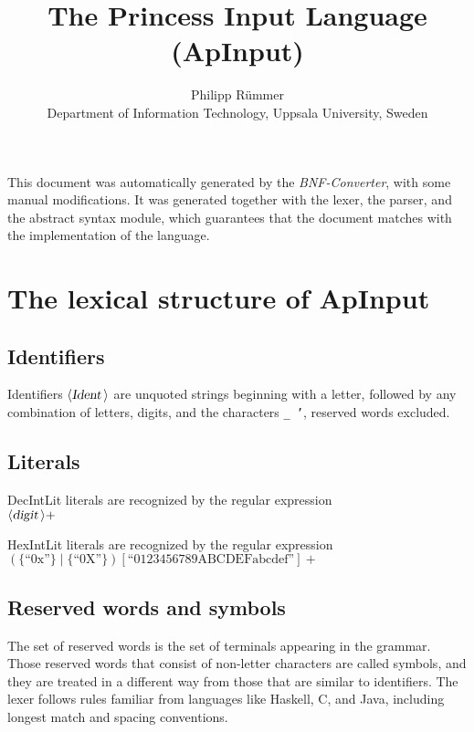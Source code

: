 \documentclass[a4paper,11pt]{article}
\author{Philipp R\"ummer\\
  Department
  of Information Technology, Uppsala University, Sweden}
\title{The Princess Input Language\\
  (ApInput)}
\begin{document}
\maketitle

\newcommand{\emptyP}{\mbox{$\epsilon$}}
\newcommand{\terminal}[1]{\mbox{{\texttt {#1}}}}
\newcommand{\nonterminal}[1]{\mbox{$\langle \mbox{{\sl #1 }} \! \rangle$}}
\newcommand{\arrow}{\mbox{::=}}
\newcommand{\delimit}{\mbox{$|$}}
\newcommand{\reserved}[1]{\mbox{{\texttt {#1}}}}
\newcommand{\literal}[1]{\mbox{{\texttt {#1}}}}
\newcommand{\symb}[1]{\mbox{{\texttt {#1}}}}

This document was automatically generated by the {\em BNF-Converter},
with some manual modifications. It was generated together with the
lexer, the parser, and the abstract syntax module, which guarantees
that the document matches with the implementation of the language.

\section*{The lexical structure of ApInput}
\subsection*{Identifiers}
Identifiers \nonterminal{Ident} are unquoted strings beginning with a letter,
followed by any combination of letters, digits, and the characters {\tt \_ '},
reserved words excluded.


\subsection*{Literals}



DecIntLit literals are recognized by the regular expression\\
\({\nonterminal{digit}}+\)

HexIntLit literals are recognized by the regular expression\\
\((\{\mbox{``0x''}\} \mid \{\mbox{``0X''}\}) [\mbox{``0123456789ABCDEFabcdef''}]+\)


\subsection*{Reserved words and symbols}
The set of reserved words is the set of terminals appearing in the grammar. Those reserved words that consist of non-letter characters are called symbols, and they are treated in a different way from those that are similar to identifiers. The lexer follows rules familiar from languages like Haskell, C, and Java, including longest match and spacing conventions.
\end{document}
